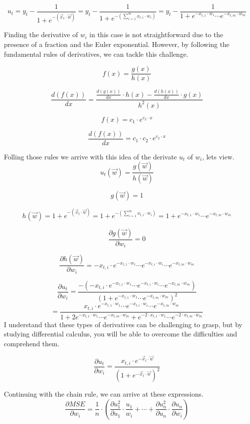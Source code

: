 \[
u_t = y_t - \frac{1}{1 + e^{-(\vec{x}_t \cdot \vec{w})}} = y_t - \frac{1}{1 + e^{-(\sum_{i = 1}^m x_{t, i} \cdot w_i)}}
= y_t - \frac{1}{1 + e^{-x_{t, 1} \cdot w_1} \cdots e^{-x_{t, m} \cdot w_m}}
\]

Finding the derivative of $w_i$ in this case is not straightforward due to the presence of a fraction and
the Euler exponential. However, by following the fundamental rules of derivatives, we can tackle this challenge.

\[
f(x) = \frac{g(x)}{h(x)}
\]

\[
\frac{d(f(x))}{dx} = \frac{\frac{d(g(x))}{dx} \cdot h(x) - \frac{d(h(x))}{dx} \cdot g(x)}{h^2(x)}
\]

\[
f(x) = c_1 \cdot e^{c_2 \cdot x}
\]

\[
\frac{d(f(x))}{dx} = c_1 \cdot c_2 \cdot e^{c_2 \cdot x}
\]

Folling those rules we arrive with this idea of the derivate $u_t$ of $w_i$, lets view.
\[
u_t(\vec{w}) = \frac{g(\vec{w})}{h(\vec{w})}
\]

\[
g(\vec{w}) = 1
\]

\[
h(\vec{w}) = 1 + e^{-(\vec{x}_t \cdot \vec{w})} = 1 + e^{-(\sum_{i = 1}^m x_{t, i} \cdot w_i)}
= 1 + e^{-x_{t, 1} \cdot w_1} \cdots e^{-x_{t, m} \cdot w_m}
\]

\[
\frac{\partial g(\vec{w})}{\partial w_i} = 0
\]

\[
\frac{\partial h(\vec{w})}{\partial w_i}
= -x_{t, i} \cdot e^{-x_{t, 1} \cdot w_1} \cdots e^{-x_{t, i} \cdot w_i} \cdots e^{-x_{t, m} \cdot w_m}
\]

\[
\frac{\partial u_t}{\partial w_i} =
\frac{- (-x_{t, i} \cdot e^{-x_{t, 1} \cdot w_1} \cdots e^{-x_{t, i} \cdot w_i} \cdots e^{-x_{t, m} \cdot w_m})}
     {(1 + e^{-x_{t, 1} \cdot w_1} \cdots e^{-x_{t, m} \cdot w_m})^2}
     \]
     \[
     = \frac{x_{t, i} \cdot e^{-x_{t, 1} \cdot w_1} \cdots e^{-x_{t, i} \cdot w_i} \cdots e^{-x_{t, m} \cdot w_m}}
     {1 + 2e^{-x_{t, 1} \cdot w_1} \cdots e^{-x_{t, m} \cdot w_m} + e^{-2 \cdot x_{t, 1} \cdot w_1} \cdots e^{-2 \cdot x_{t, m} \cdot w_m}}
\]
I understand that these types of derivatives can be challenging to grasp, but by studying
differential calculus, you will be able to overcome the difficulties and comprehend them.

\[
\frac{\partial u_t}{\partial w_i} =
\frac{x_{t, i} \cdot e^{- \vec{x}_t \cdot \vec{w}}}
     {(1 + e^{- \vec{x}_t \cdot \vec{w}})^2}
\]

Continuing with the chain rule, we can arrive at these expressions.
\[
\frac{\partial MSE}{\partial w_i} = \frac{1}{n} \cdot (\frac{\partial u_1^2}{\partial u_1} \cdot
\frac{u_1}{w_i} + \cdots + \frac{\partial u_n^2}{\partial u_n} \cdot \frac{\partial u_n}{\partial w_i})
\]


